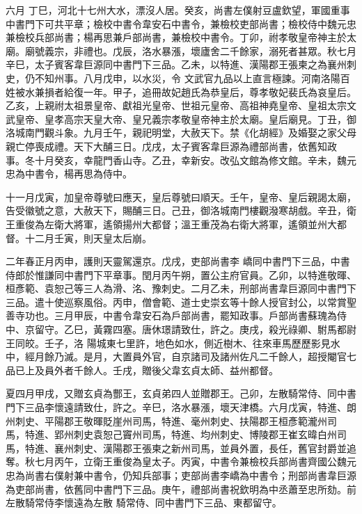 \begin{pinyinscope}
 六月
 丁巳，河北十七州大水，漂沒人居。癸亥，尚書左僕射豆盧欽望，軍國重事中書門下可共平章；檢校中書令韋安石中書令，兼檢校吏部尚書；檢校侍中魏元忠兼檢校兵部尚書；楊再思兼戶部尚書，兼檢校中書令。丁卯，祔孝敬皇帝神主於太廟。廟號義宗，非禮也。戊辰，洛水暴漲，壞廬舍二千餘家，溺死者甚眾。秋七月辛巳，太子賓客韋巨源同中書門下三品。乙未，以特進、漢陽郡王張柬之為襄州刺史，仍不知州事。八月戊申，以水災，令
 文武官九品以上直言極諫。河南洛陽百姓被水兼損者給復一年。甲子，追冊故妃趙氏為恭皇后，尊孝敬妃裴氏為哀皇后。乙亥，上親祔太祖景皇帝、獻祖光皇帝、世祖元皇帝、高祖神堯皇帝、皇祖太宗文武皇帝、皇孝高宗天皇大帝、皇兄義宗孝敬皇帝神主於太廟。皇后廟見。丁丑，御洛城南門觀斗象。九月壬午，親祀明堂，大赦天下。禁《化胡經》及婚娶之家父母親亡停喪成禮。天下大酺三日。戊戌，太子賓客韋巨源為禮部尚書，依舊知政
 事。冬十月癸亥，幸龍門香山寺。乙丑，幸新安。改弘文館為修文館。辛未，魏元忠為中書令，楊再思為侍中。



 十一月戊寅，加皇帝尊號曰應天，皇后尊號曰順天。壬午，皇帝、皇后親謁太廟，告受徽號之意，大赦天下，賜酺三日。己丑，御洛城南門樓觀潑寒胡戲。辛丑，衛王重俊為左衛大將軍，遙領揚州大都督；溫王重茂為右衛大將軍，遙領並州大都督。十二月壬寅，則天皇太后崩。



 二年春正月丙申，護則天靈駕還京。戊戌，吏部尚書李
 嶠同中書門下三品，中書侍郎於惟謙同中書門下平章事。閏月丙午朔，置公主府官員。乙卯，以特進敬暉、桓彥範、袁恕己等三人為滑、洺、豫刺史。二月乙未，刑部尚書韋巨源同中書門下三品。遣十使巡察風俗。丙申，僧會範、道士史崇玄等十餘人授官封公，以常賞聖善寺功也。三月甲辰，中書令韋安石為戶部尚書，罷知政事。戶部尚書蘇瑰為侍中、京留守。乙巳，黃霧四塞。唐休璟請致仕，許之。庚戌，殺光祿卿、駙馬都尉王同皎。壬子，洛
 陽城東七里許，地色如水，側近樹木、往來車馬歷歷影見水中，經月餘乃滅。是月，大置員外官，自京諸司及諸州佐凡二千餘人，超授閹官七品已上及員外者千餘人。壬戌，贈後父韋玄貞太師、益州都督。



 夏四月甲戌，又贈玄貞為酆王，玄貞弟四人並贈郡王。己卯，左散騎常侍、同中書門下三品李懷遠請致仕，許之。辛巳，洛水暴漲，壞天津橋。六月戊寅，特進、朗州刺史、平陽郡王敬暉貶崖州司馬，特進、毫州刺史、扶陽郡王桓彥範瀧州司
 馬，特進、郢州刺史袁恕己竇州司馬，特進、均州刺史、博陵郡王崔玄暐白州司馬，特進、襄州刺史、漢陽郡王張柬之新州司馬，並員外置，長任，舊官封爵並追奪。秋七月丙午，立衛王重俊為皇太子。丙寅，中書令兼檢校兵部尚書齊國公魏元忠為尚書右僕射兼中書令，仍知兵部事；吏部尚書李嶠為中書令；刑部尚書韋巨源為吏部尚書，依舊同中書門下三品。庚午，禮部尚書祝欽明為中丞蕭至忠所劾。前左散騎常侍李懷遠為左散
 騎常侍、同中書門下三品、東都留守。




\end{pinyinscope}
